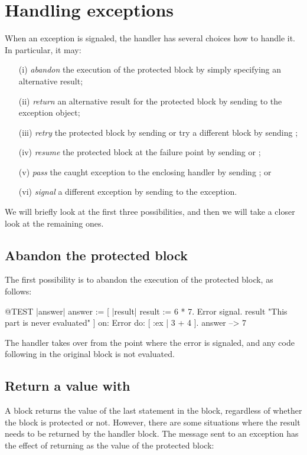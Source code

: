 \documentclass[a4paper,10pt,twoside]{book}
\begin{document}
\section{Handling exceptions}

When an exception is signaled, the handler has several choices how to handle it.
In particular, it may:
\begin{itemize}
\item[(i)] \emph{abandon} the execution of the protected block by simply specifying an alternative result;
\item[(ii)] \emph{return} an alternative result for the protected block by sending  to the exception object;
\item[(iii)] \emph{retry} the protected block by sending  or try a different block by sending ;
\item[(iv)] \emph{resume} the protected block at the failure point by sending  or ;
\item[(v)] \emph{pass} the caught exception to the enclosing handler by sending ; or
\item[(vi)] \emph{signal} a different exception by sending  to the exception.
\end{itemize}

We will briefly look at the first three possibilities, and then we will take a closer look at the remaining ones.

\subsection{Abandon the protected block}

The first possibility is to abandon the execution of the protected block, as follows:
\begin{code}{@TEST |answer|}
answer := [ |result|
	result := 6 * 7.
	Error signal.
	result 	"This part is never evaluated"
]	on: Error
	do: [ :ex | 3 + 4 ].
answer --> 7
\end{code}

The handler takes over from the point where the error is signaled, and any code following in the original block is not evaluated.

\subsection{Return a value with }
A block returns the value of the last statement in the block, regardless of whether the block is protected or not. However, there are some situations where the result needs to be returned by the handler block. The message  sent to an exception has the effect of returning  as the value of the protected block:
\end{document}
